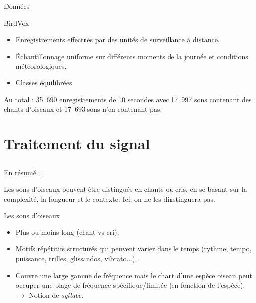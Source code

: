 \documentclass[compress,xcolor=table]{beamer}
\begin{document}
\begin{frame}{Données}

    \begin{exampleblock}{BirdVox}
        \begin{itemize}
            \item Enregistrements effectués par des unités de surveillance à distance.
            \item Échantillonnage uniforme sur différents moments de la journée et conditions météorologiques.
            \item Classes équilibrées
        \end{itemize}
    \end{exampleblock}

    Au total : 35~690 enregistrements de 10 secondes avec 17~997 sons contenant des chants d'oiseaux et 17~693 sons n'en contenant pas.

\end{frame}

\section{Traitement du signal} \subsection{}

\begin{frame}{En résumé...}

    Les sons d'oiseaux peuvent être distingués en chants ou cris, en se basant sur la complexité, la longueur et le contexte. Ici, on ne les dinstinguera pas.

    \begin{block}{Les sons d'oiseaux}
        \begin{itemize}
            \item Plus ou moins long (chant vs cri).
            \item Motifs répétitifs structurés qui peuvent varier dans le temps (rythme, tempo, puissance, trilles, glissandos, vibrato...).
            \item Couvre une large gamme de fréquence mais le chant d'une espèce oiseau peut occuper une plage de fréquence spécifique/limitée (en fonction de l'espèce).\\
                  $\rightarrow$ Notion de \textit{syllabe}.
        \end{itemize}
    \end{block}

\end{frame}
\end{document}
